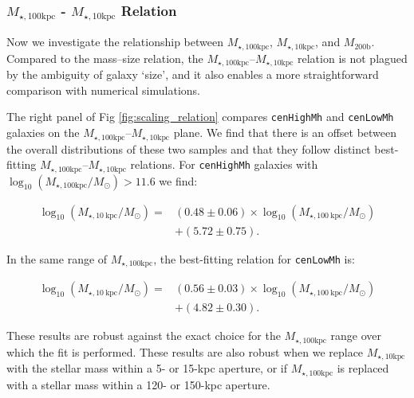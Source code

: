 \documentclass[a4paper,fleqn,usenatbib]{mnras}
\def\rbcg{\texttt{cenHighMh}}
\def\nbcg{\texttt{cenLowMh}}
\def\mhalo{{$M_{\mathrm{200b}}$}}
\def\minn{{$M_{\star,10\mathrm{kpc}}$}}
\def\mtot{{$M_{\star,100\mathrm{kpc}}$}}
\def\logmtot{{$\log_{10} (M_{\star,100\mathrm{kpc}}/M_{\odot})$}}
\begin{document}
    
\subsubsection{\mtot{} - \minn{} Relation}
    \label{sssec:m100_m10}
    
    Now we investigate the relationship between \mtot{}, \minn{}, and \mhalo{}. 
    Compared to the mass--size relation, the \mtot{}--\minn{} relation is not plagued 
    by the ambiguity of galaxy `size', and it also enables a more straightforward 
    comparison with numerical simulations.
    
    The right panel of Fig \ref{fig:scaling_relation} compares \rbcg{} and \nbcg{}
    galaxies on the \mtot{}--\minn{} plane. 
    We find that there is an offset between the overall distributions of these two
    samples and that they follow distinct best-fitting \mtot{}--\minn{} relations. 
    For \rbcg{} galaxies with \logmtot{}$>11.6$ we find:
    
    \begin{equation}
        \begin{aligned}
        \log_{10} (M_{\star, 10\ \mathrm{kpc}}/M_{\odot}) = & (0.48\pm0.06) \times \log_{10} (M_{\star, 100\ \mathrm{kpc}}/M_{\odot}) \\ & +(5.72\pm0.75).
        \end{aligned}
    \end{equation}
    
    \noindent In the same range of \mtot{}, the best-fitting relation for \nbcg{} is:
     
    \begin{equation}
        \begin{aligned}
        \log_{10} (M_{\star, 10\ \mathrm{kpc}}/M_{\odot}) = & (0.56\pm0.03) \times \log_{10} (M_{\star, 100\ \mathrm{kpc}}/M_{\odot}) \\ & +(4.82\pm0.30).
        \end{aligned}
    \end{equation}
    
    These results are robust against the exact choice for the \mtot{} range over which 
    the fit is performed. 
    These results are also robust when we replace \minn{} with the stellar 
    mass within a 5- or 15-kpc aperture, or if \mtot{} is replaced with a stellar mass 
    within a 120- or 150-kpc aperture.  
    
\end{document}
